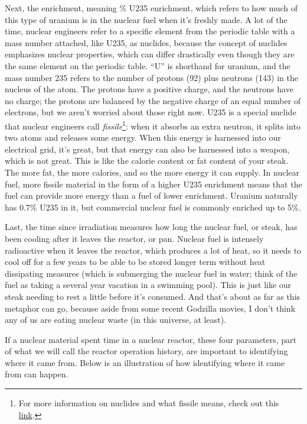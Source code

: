 {Next, the enrichment, meaning \% \gls{U235} enrichment, which refers to how
much of this type of uranium is in the nuclear fuel when it's freshly made.  A
lot of the time, nuclear engineers refer to a specific element from the
periodic table with a mass number attached, like \gls{U235}, as nuclides,
because the concept of nuclides emphasizes nuclear properties, which can differ
drastically even though they are the same element on the periodic table. ``U'' is
shorthand for uranium, and the mass number 235 refers to the number of protons
(92) plus neutrons (143) in the nucleus of the atom. The protons have a
positive charge, and the neutrons have no charge; the protons are balanced by
the negative charge of an equal number of electrons, but we aren't worried
about those right now. \gls{U235} is a special nuclide that nuclear engineers
call \textit{fissile}\footnote{For more information on nuclides and what
fissile means, check out this
\href{https://whatisnuclear.com/isotopes.html}{\color{blue}link}.}: when it
absorbs an extra neutron, it splits into two atoms and releases some energy.
When this energy is harnessed into our electrical grid, it's great, but that
energy can also be harnessed into a weapon, which is not great. This is like
the calorie content or fat content of your steak. The more fat, the more
calories, and so the more energy it can supply. In nuclear fuel, more fissile
material in the form of a higher \gls{U235} enrichment means that the fuel can
provide more energy than a fuel of lower enrichment. Uranium naturally has
0.7\% \gls{U235} in it, but commercial nuclear fuel is commonly enriched up to
5\%.

Last, the time since irradiation measures how long the nuclear fuel, or steak,
has been cooling after it leaves the reactor, or pan. Nuclear fuel is intensely
radioactive when it leaves the reactor, which produces a lot of heat, so it
needs to cool off for a few years to be able to be stored longer term without
heat dissipating measures (which is submerging the nuclear fuel in water; think
of the fuel as taking a several year vacation in a swimming pool). This is just
like our steak needing to rest a little before it's consumed. And that's about
as far as this metaphor can go, because aside from some recent Godzilla movies,
I don't think any of us are eating nuclear waste (in this universe, at least). 

If a nuclear material spent time in a nuclear reactor, these four parameters,
part of what we will call the reactor operation history, are important to
identifying where it came from. Below is an illustration of how identifying
where it came from can happen.

}

